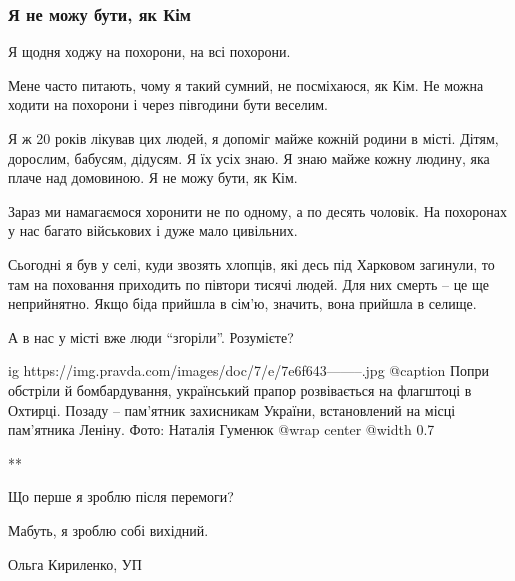  
 
 
 
 

\subsubsection{Я не можу бути, як Кім}
\label{sec:30_03_2022.stz.news.ua.pravda.2.ohtyrka.7.kim}

Я щодня ходжу на похорони, на всі похорони. 

Мене часто питають, чому я такий сумний, не посміхаюся, як Кім. Не можна ходити
на похорони і через півгодини бути веселим.

Я ж 20 років лікував цих людей, я допоміг майже кожній родини в місті. Дітям,
дорослим, бабусям, дідусям. Я їх усіх знаю.  Я знаю майже кожну людину, яка
плаче над домовиною. Я не можу бути, як Кім.

Зараз ми намагаємося хоронити не по одному, а по десять чоловік. На похоронах у
нас багато військових і дуже мало цивільних. 

Сьогодні я був у селі, куди звозять хлопців, які десь під Харковом загинули, то
там на поховання приходить по півтори тисячі людей. Для них смерть – це ще
неприйнятно. Якщо біда прийшла в сім'ю, значить, вона прийшла в селище.

А в нас у місті вже люди \enquote{згоріли}. Розумієте?

\ifcmt
  ig https://img.pravda.com/images/doc/7/e/7e6f643--------.jpg
	@caption Попри обстріли й бомбардування, український прапор розвівається на флагштоці в Охтирці. Позаду – пам'ятник захисникам України, встановлений на місці пам'ятника Леніну. Фото: Наталія Гуменюк
  @wrap center
  @width 0.7
\fi

** 

Що перше я зроблю після перемоги? 

Мабуть, я зроблю собі вихідний.

Ольга Кириленко, УП
